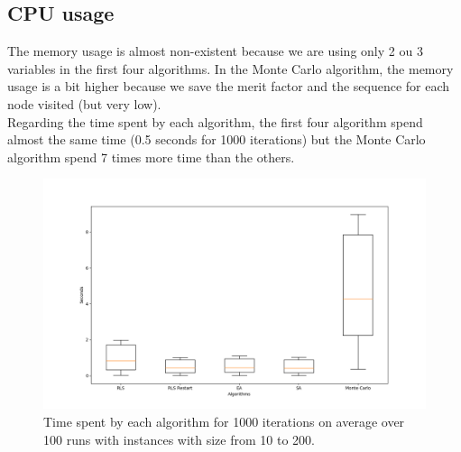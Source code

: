 \documentclass[a4paper,11pt,openany]{article}
\begin{document}
\subsection{CPU usage}
The memory usage is almost non-existent because we are using only 2 ou 3 variables in the first four algorithms. In the Monte Carlo algorithm, the memory usage is a bit higher because we save the merit factor and the sequence for each node visited (but very low).\\
Regarding the time spent by each algorithm, the first four algorithm spend almost the same time (0.5 seconds for 1000 iterations) but the Monte Carlo algorithm spend 7 times more time than the others.
\begin{figure}[H]
\begin{center}
\includegraphics[scale=0.26]{Images/time_spent}
\caption{Time spent by each algorithm for 1000 iterations on average over 100 runs with instances with size from 10 to 200.}
\label{fig:time_spent}
\end{center}
\end{figure}
\end{document}
